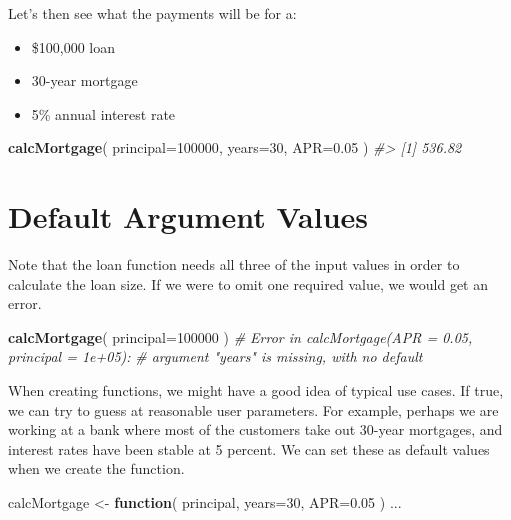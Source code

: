 \documentclass[]{book}
\newenvironment{Shaded}{\begin{snugshade}}{\end{snugshade}}
\newcommand{\CommentTok}[1]{\textcolor[rgb]{0.56,0.35,0.01}{\textit{#1}}}
\newcommand{\ControlFlowTok}[1]{\textcolor[rgb]{0.13,0.29,0.53}{\textbf{#1}}}
\newcommand{\DataTypeTok}[1]{\textcolor[rgb]{0.13,0.29,0.53}{#1}}
\newcommand{\DecValTok}[1]{\textcolor[rgb]{0.00,0.00,0.81}{#1}}
\newcommand{\FloatTok}[1]{\textcolor[rgb]{0.00,0.00,0.81}{#1}}
\newcommand{\KeywordTok}[1]{\textcolor[rgb]{0.13,0.29,0.53}{\textbf{#1}}}
\newcommand{\NormalTok}[1]{#1}
\newcommand{\StringTok}[1]{\textcolor[rgb]{0.31,0.60,0.02}{#1}}
\providecommand{\tightlist}{%
  \setlength{\itemsep}{0pt}\setlength{\parskip}{0pt}}
\theoremstyle{definition}
\theoremstyle{definition}
\theoremstyle{definition}
\theoremstyle{remark}
\begin{document}
Let's then see what the payments will be for a:

\begin{itemize}
\tightlist
\item
  \$100,000 loan
\item
  30-year mortgage
\item
  5\% annual interest rate
\end{itemize}

\begin{Shaded}
\begin{Highlighting}[]
\KeywordTok{calcMortgage}\NormalTok{( }\DataTypeTok{principal=}\DecValTok{100000}\NormalTok{, }\DataTypeTok{years=}\DecValTok{30}\NormalTok{, }\DataTypeTok{APR=}\FloatTok{0.05}\NormalTok{  )}
\CommentTok{#> [1] 536.82}
\end{Highlighting}
\end{Shaded}

\hypertarget{default-argument-values}{%
\section{Default Argument Values}\label{default-argument-values}}

Note that the loan function needs all three of the input values in order
to calculate the loan size. If we were to omit one required value, we
would get an error.

\begin{Shaded}
\begin{Highlighting}[]
\KeywordTok{calcMortgage}\NormalTok{( }\DataTypeTok{principal=}\DecValTok{100000}\NormalTok{  )}
\CommentTok{# Error in calcMortgage(APR = 0.05, principal = 1e+05):  }
\CommentTok{#  argument "years" is missing, with no default }
\end{Highlighting}
\end{Shaded}

When creating functions, we might have a good idea of typical use cases.
If true, we can try to guess at reasonable user parameters. For example,
perhaps we are working at a bank where most of the customers take out
30-year mortgages, and interest rates have been stable at 5 percent. We
can set these as default values when we create the function.

\begin{Shaded}
\begin{Highlighting}[]
\NormalTok{   calcMortgage <-}\StringTok{ }\ControlFlowTok{function}\NormalTok{( principal, }\DataTypeTok{years=}\DecValTok{30}\NormalTok{, }\DataTypeTok{APR=}\FloatTok{0.05}\NormalTok{ )}
\NormalTok{   ...}
\end{Highlighting}
\end{Shaded}
\end{document}
